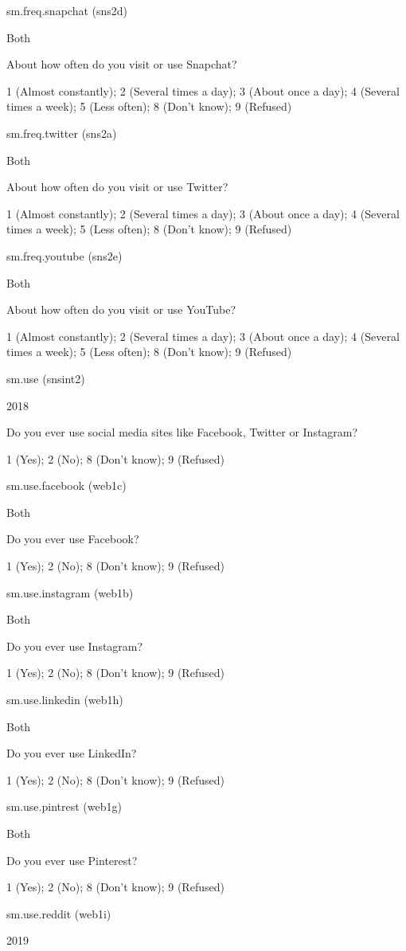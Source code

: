 \documentclass[]{book}
\begin{document}
sm.freq.snapchat (sns2d)

Both

About how often do you visit or use Snapchat?

1 (Almost constantly); 2 (Several times a day); 3 (About once a day); 4
(Several times a week); 5 (Less often); 8 (Don't know); 9 (Refused)

sm.freq.twitter (sns2a)

Both

About how often do you visit or use Twitter?

1 (Almost constantly); 2 (Several times a day); 3 (About once a day); 4
(Several times a week); 5 (Less often); 8 (Don't know); 9 (Refused)

sm.freq.youtube (sns2e)

Both

About how often do you visit or use YouTube?

1 (Almost constantly); 2 (Several times a day); 3 (About once a day); 4
(Several times a week); 5 (Less often); 8 (Don't know); 9 (Refused)

sm.use (snsint2)

2018

Do you ever use social media sites like Facebook, Twitter or Instagram?

1 (Yes); 2 (No); 8 (Don't know); 9 (Refused)

sm.use.facebook (web1c)

Both

Do you ever use Facebook?

1 (Yes); 2 (No); 8 (Don't know); 9 (Refused)

sm.use.instagram (web1b)

Both

Do you ever use Instagram?

1 (Yes); 2 (No); 8 (Don't know); 9 (Refused)

sm.use.linkedin (web1h)

Both

Do you ever use LinkedIn?

1 (Yes); 2 (No); 8 (Don't know); 9 (Refused)

sm.use.pintrest (web1g)

Both

Do you ever use Pinterest?

1 (Yes); 2 (No); 8 (Don't know); 9 (Refused)

sm.use.reddit (web1i)

2019
\end{document}

